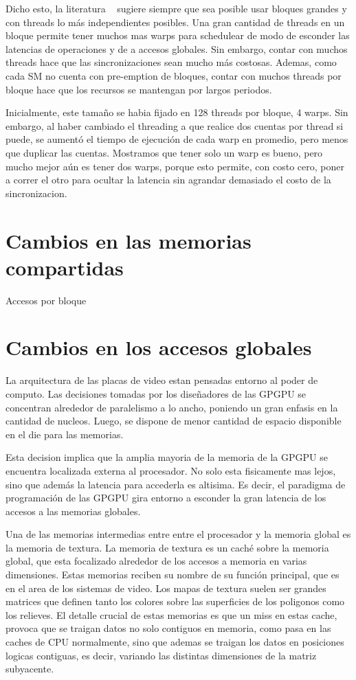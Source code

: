 Dicho esto, la literatura ~\cite{farberCuda} sugiere siempre que sea posible
usar bloques grandes y con threads lo m\'as independientes posibles. Una gran cantidad de threads
en un bloque permite tener muchos mas warps para schedulear de modo de esconder las latencias de
operaciones y de a accesos globales. Sin embargo, contar con muchos threads hace que las
sincronizaciones sean mucho m\'as costosas. Ademas, como cada SM no cuenta con pre-emption
de bloques, contar con muchos threads por bloque hace que los recursos se mantengan
por largos periodos.

Inicialmente, este tama\~no se habia fijado en 128 threads por bloque, 4 warps. Sin embargo,
al haber cambiado el threading a que realice dos cuentas por thread si puede, se aument\'o
el tiempo de ejecuci\'on de cada warp en promedio, pero menos que duplicar las cuentas.
Mostramos que tener solo un warp es bueno, pero mucho mejor a\'un es tener dos warps, porque
esto permite, con costo cero, poner a correr el otro para ocultar la latencia sin agrandar
demasiado el costo de la sincronizacion.


\section{Cambios en las memorias compartidas}
Accesos por bloque

\section{Cambios en los accesos globales}
La arquitectura de las placas de video estan pensadas entorno al poder de computo.
Las decisiones tomadas por los diseñadores de las GPGPU se concentran alrededor
de paralelismo a lo ancho, poniendo un gran enfasis en la cantidad de nucleos. Luego,
se dispone de menor cantidad de espacio disponible en el die para las memorias.

Esta decision implica que la amplia mayoria de la memoria de la GPGPU se encuentra
localizada externa al procesador.  No solo esta fisicamente mas lejos, sino que
adem\'as la latencia para accederla es altisima. Es decir, el paradigma de
programaci\'on de las GPGPU gira entorno a esconder la gran latencia de los accesos
a las memorias globales.

Una de las memorias intermedias entre entre el procesador y la memoria global es
la memoria de textura. La memoria de textura es un cach\'e sobre la memoria global,
que esta focalizado alrededor de los accesos a memoria en varias dimensiones.
Estas memorias reciben su nombre de su funci\'on principal, que es en el area de los
sistemas de video. Los mapas de textura suelen ser grandes matrices que definen
tanto los colores sobre las superficies de los poligonos como los relieves.
El detalle crucial de estas memorias es que un miss en estas cache, provoca
que se traigan datos no solo contiguos en memoria, como pasa en las caches de
CPU normalmente, sino que ademas se traigan los datos en posiciones logicas contiguas,
es decir, variando las distintas dimensiones de la matriz subyacente.

